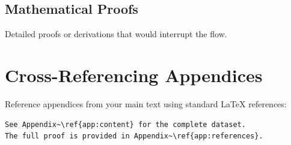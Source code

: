 \begin{appendices}
\subsection{Mathematical Proofs}\label{subsec:appendix-proofs}
Detailed proofs or derivations that would interrupt the flow.

\section{Cross-Referencing Appendices}\label{sec:references}
Reference appendices from your main text using standard LaTeX references:

\begin{verbatim}
See Appendix~\ref{app:content} for the complete dataset.
The full proof is provided in Appendix~\ref{app:references}.
\end{verbatim}

\end{appendices}
